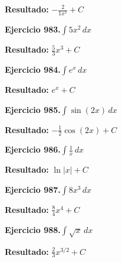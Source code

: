 \documentclass[10pt,a4paper]{article}
\begin{document}
\begin{solbox}
\textbf{Resultado:} \(\displaystyle -\frac{2}{1x^{1}} + C\)
\end{solbox}

\begin{ejbox}
\textbf{Ejercicio 983.}\quad $\int 5x^{2}\,dx$
\end{ejbox}

\begin{solbox}
\textbf{Resultado:} \(\displaystyle \frac{5}{3}x^{3} + C\)
\end{solbox}

\begin{ejbox}
\textbf{Ejercicio 984.}\quad $\int e^x\,dx$
\end{ejbox}

\begin{solbox}
\textbf{Resultado:} \(\displaystyle e^x + C\)
\end{solbox}

\newpage
\begin{ejbox}
\textbf{Ejercicio 985.}\quad $\int \sin(2x)\,dx$
\end{ejbox}

\begin{solbox}
\textbf{Resultado:} \(\displaystyle -\frac{1}{2}\cos(2x) + C\)
\end{solbox}

\begin{ejbox}
\textbf{Ejercicio 986.}\quad $\int \frac{1}{x}\,dx$
\end{ejbox}

\begin{solbox}
\textbf{Resultado:} \(\displaystyle \ln|x| + C\)
\end{solbox}

\begin{ejbox}
\textbf{Ejercicio 987.}\quad $\int 8x^{3}\,dx$
\end{ejbox}

\begin{solbox}
\textbf{Resultado:} \(\displaystyle \frac{8}{4}x^{4} + C\)
\end{solbox}

\newpage
\begin{ejbox}
\textbf{Ejercicio 988.}\quad $\int \sqrt{x}\,dx$
\end{ejbox}

\begin{solbox}
\textbf{Resultado:} \(\displaystyle \frac{2}{3}x^{3/2} + C\)
\end{solbox}
\end{document}
